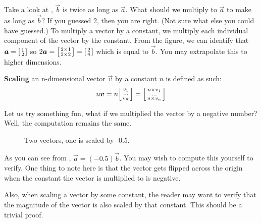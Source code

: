 Take a look at , \(\vec{b}\) is twice as long as \(\vec{a}\). What should we multiply to \(\vec{a}\) to make as long as \(\vec{b}\)? If you guessed 2, then you are right. (Not sure what else you could have guessed.) To multiply a vector by a constant, we multiply each individual component of the vector by the constant. From the figure, we can identify that \(\vec{a}=\begin{bsmallmatrix}
  1 \\
  2
\end{bsmallmatrix}\) so \(2\vec{a} = \begin{bsmallmatrix}
  2 \times 1 \\
  2 \times 2
\end{bsmallmatrix} = \begin{bsmallmatrix}
  2 \\
  4
\end{bsmallmatrix}\) which is equal to \(\vec{b}\). You may extrapolate this to higher dimensions.
\begin{definition}
  \textbf{Scaling} an n-dimensional vector \(\vec{v}\) by a constant \(n\) is defined as such:
  \begin{equation*}
    n\vec{v} = n \begin{bsmallmatrix}
      v_1 \\
      \dots \\
      v_n
    \end{bsmallmatrix} = \begin{bsmallmatrix}
      n \times v_1 \\
      \dots \\
      n \times v_n
    \end{bsmallmatrix}
  \end{equation*}
\end{definition}
Let us try something fun, what if we multiplied the vector by a negative number? Well, the computation remains the same.
\begin{figure}
  \centering
  \caption{Two vectors, one is scaled by -0.5.}
  \label{scalevectorneg}
\end{figure} 
As you can see from , \(\vec{a}=(-0.5)\vec{b}\). You may wish to compute this yourself to verify. One thing to note here is that the vector gets flipped across the origin when the constant the vector is multiplied to is negative. 
\begin{challenge}
  Also, when scaling a vector by some constant, the reader may want to verify that the magnitude of the vector is also scaled by that constant. This should be a trivial proof.
\end{challenge}


